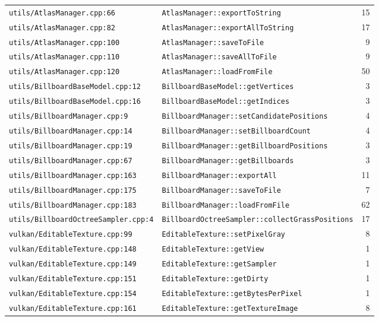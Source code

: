 \documentclass[11pt,a4paper]{article}
\begin{document}
{\begin{longtable}{L{0.40\textwidth} L{0.48\textwidth} r}
\texttt{utils/AtlasManager.cpp:66} & \texttt{AtlasManager::exportToString} & 15 \\
\texttt{utils/AtlasManager.cpp:82} & \texttt{AtlasManager::exportAllToString} & 17 \\
\texttt{utils/AtlasManager.cpp:100} & \texttt{AtlasManager::saveToFile} & 9 \\
\texttt{utils/AtlasManager.cpp:110} & \texttt{AtlasManager::saveAllToFile} & 9 \\
\texttt{utils/AtlasManager.cpp:120} & \texttt{AtlasManager::loadFromFile} & 50 \\
\texttt{utils/BillboardBaseModel.cpp:12} & \texttt{BillboardBaseModel::getVertices} & 3 \\
\texttt{utils/BillboardBaseModel.cpp:16} & \texttt{BillboardBaseModel::getIndices} & 3 \\
\texttt{utils/BillboardManager.cpp:9} & \texttt{BillboardManager::setCandidatePositions} & 4 \\
\texttt{utils/BillboardManager.cpp:14} & \texttt{BillboardManager::setBillboardCount} & 4 \\
\texttt{utils/BillboardManager.cpp:19} & \texttt{BillboardManager::getBillboardPositions} & 3 \\
\texttt{utils/BillboardManager.cpp:67} & \texttt{BillboardManager::getBillboards} & 3 \\
\texttt{utils/BillboardManager.cpp:163} & \texttt{BillboardManager::exportAll} & 11 \\
\texttt{utils/BillboardManager.cpp:175} & \texttt{BillboardManager::saveToFile} & 7 \\
\texttt{utils/BillboardManager.cpp:183} & \texttt{BillboardManager::loadFromFile} & 62 \\
\texttt{utils/BillboardOctreeSampler.cpp:4} & \texttt{BillboardOctreeSampler::collectGrassPositions} & 17 \\
\texttt{vulkan/EditableTexture.cpp:99} & \texttt{EditableTexture::setPixelGray} & 8 \\
\texttt{vulkan/EditableTexture.cpp:148} & \texttt{EditableTexture::getView} & 1 \\
\texttt{vulkan/EditableTexture.cpp:149} & \texttt{EditableTexture::getSampler} & 1 \\
\texttt{vulkan/EditableTexture.cpp:151} & \texttt{EditableTexture::getDirty} & 1 \\
\texttt{vulkan/EditableTexture.cpp:154} & \texttt{EditableTexture::getBytesPerPixel} & 1 \\
\texttt{vulkan/EditableTexture.cpp:161} & \texttt{EditableTexture::getTextureImage} & 8 \\

\end{longtable}}
\end{document}
